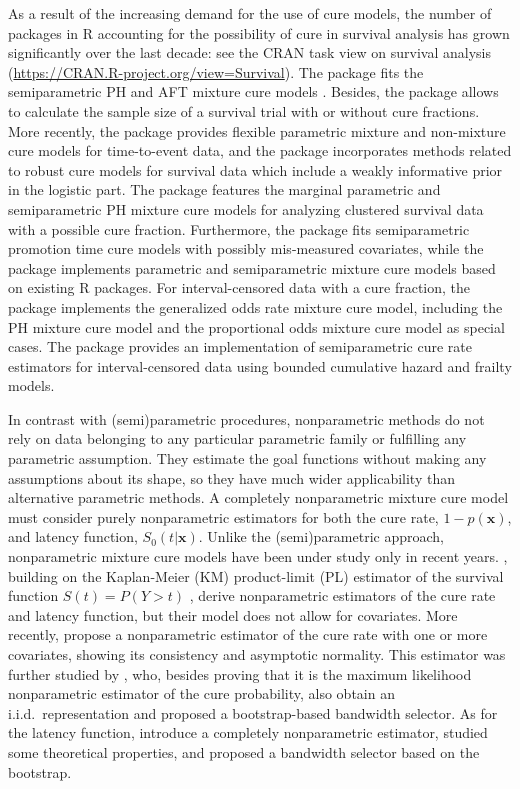 As a result of the increasing demand for the use of cure models, the number of packages in R accounting for the possibility of cure in survival analysis has grown significantly over the last decade: see the CRAN task view on survival analysis (\url{https://CRAN.R-project.org/view=Survival}). The  package \citep{Cai1} fits the semiparametric PH and AFT mixture cure models \citep[see][]{Kalbfleisch}. Besides, the  package \citep{Cai2} allows to calculate the sample size of a survival trial with or without cure fractions. More recently, the  package \citep{Amdahl} provides flexible parametric mixture and non-mixture cure models for time-to-event data, and the  package \citep{Han} incorporates methods related to robust cure models for survival data which include a weakly informative prior in the logistic part. The  package \citep{Niu} features the marginal parametric and semiparametric PH mixture cure models for analyzing clustered survival data with a possible cure fraction. Furthermore, the  package \citep{Bertrand} fits semiparametric promotion time cure models with possibly mis-measured covariates, while the  package \citep{Peng3} implements parametric and semiparametric mixture cure models based on existing R packages. For interval-censored data with a cure fraction, the  package \citep{Zhou} implements the generalized odds rate mixture cure model, including the PH mixture cure model and the proportional odds mixture cure model as special cases. The  package \citep{Brettas} provides an implementation of semiparametric cure rate estimators for interval-censored data using bounded cumulative hazard and frailty models. 

In contrast with (semi)parametric procedures, nonparametric methods do not rely on data belonging to any particular parametric family or fulfilling any parametric assumption. They estimate the goal functions without making any assumptions about its shape, so they have much wider applicability than alternative parametric methods. A completely nonparametric mixture cure model must consider purely nonparametric estimators for both the cure rate, $1-p(\mathbf{x})$, and latency function, $S_0 \left (t|\mathbf{x} \right)$. Unlike the (semi)parametric approach, nonparametric mixture cure models have been under study only in recent years. \citet{Laska}, building on the Kaplan-Meier (KM) product-limit (PL) estimator of the survival function $S\left (t \right)=P\left (Y>t \right)$ \citep{Kaplan}, derive nonparametric estimators of the cure rate and latency function, but their model does not allow for covariates. More recently, \citet{Xu} propose a nonparametric estimator of the cure rate with one or more covariates, showing its consistency and asymptotic normality. This estimator was further studied by \citet{Lopez1}, who, besides proving that it is the maximum likelihood nonparametric estimator of the cure probability, also obtain an i.i.d.\ representation and proposed a bootstrap-based bandwidth selector. As for the latency function, \citet{Lopez2} introduce a completely nonparametric estimator, studied some theoretical properties, and proposed a bandwidth selector based on the bootstrap.

